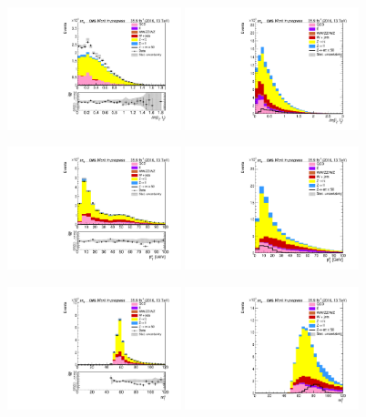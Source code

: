 \begin{figure}[htp]
	\includegraphics[width=0.45\textwidth]{plots/et/DiEta_CR.pdf}
	\includegraphics[width=0.45\textwidth]{plots/et/DiEta_withsignal.pdf}

	\includegraphics[width=0.45\textwidth]{plots/et/DiLepPt_CR.pdf}
	\includegraphics[width=0.45\textwidth]{plots/et/DiLepPt_withsignal.pdf}

	\includegraphics[width=0.45\textwidth]{plots/et/DiTransverseMass_CR.pdf}
	\includegraphics[width=0.45\textwidth]{plots/et/DiTransverseMass_withsignal.pdf}
\end{figure}


